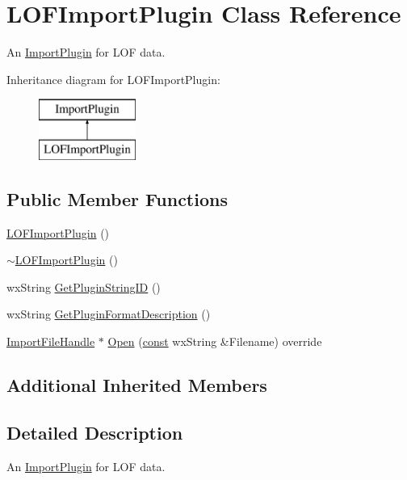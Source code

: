 \hypertarget{class_l_o_f_import_plugin}{}\section{L\+O\+F\+Import\+Plugin Class Reference}
\label{class_l_o_f_import_plugin}


An \hyperlink{class_import_plugin}{Import\+Plugin} for L\+OF data.  


Inheritance diagram for L\+O\+F\+Import\+Plugin\+:\begin{figure}[H]
\begin{center}
\leavevmode
\includegraphics[height=2.000000cm]{class_l_o_f_import_plugin}
\end{center}
\end{figure}
\subsection*{Public Member Functions}
\begin{DoxyCompactItemize}
\item 
\hyperlink{class_l_o_f_import_plugin_aafa439df534fe6614c0d52965cfcb2d7}{L\+O\+F\+Import\+Plugin} ()
\item 
\hyperlink{class_l_o_f_import_plugin_a7841b70c3a6532ca93cc51fc2f9678fa}{$\sim$\+L\+O\+F\+Import\+Plugin} ()
\item 
wx\+String \hyperlink{class_l_o_f_import_plugin_a3d55edae9fb973bdbf7f6545512f9f38}{Get\+Plugin\+String\+ID} ()
\item 
wx\+String \hyperlink{class_l_o_f_import_plugin_a265b8973e207cd2d1715e867bd306f35}{Get\+Plugin\+Format\+Description} ()
\item 
\hyperlink{class_import_file_handle}{Import\+File\+Handle} $\ast$ \hyperlink{class_l_o_f_import_plugin_a31a15d2cf0509cddb0b78c0aa0f2e647}{Open} (\hyperlink{getopt1_8c_a2c212835823e3c54a8ab6d95c652660e}{const} wx\+String \&Filename) override
\end{DoxyCompactItemize}
\subsection*{Additional Inherited Members}


\subsection{Detailed Description}
An \hyperlink{class_import_plugin}{Import\+Plugin} for L\+OF data. 

